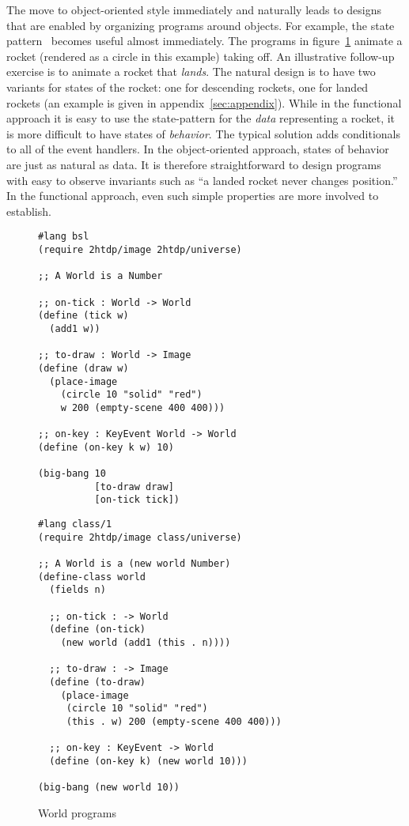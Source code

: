 \documentclass[submission,copyright]{eptcs}
\begin{document}
The move to object-oriented style immediately and naturally leads to
designs that are enabled by organizing programs around objects.  For
example, the state pattern~\cite{samth:GOF} becomes useful almost
immediately.  The programs in figure~\ref{fig:world} animate a rocket
(rendered as a circle in this example) taking off.  An illustrative
follow-up exercise is to animate a rocket that \emph{lands}.  The
natural design is to have two variants for states of the rocket: one
for descending rockets, one for landed rockets (an example is given in
appendix~\ref{sec:appendix}).  While in the functional approach it
is easy to use the state-pattern for the \emph{data} representing a
rocket, it is more difficult to have states of \emph{behavior}.  The
typical solution adds conditionals to all of the event handlers.  In
the object-oriented approach, states of behavior are just as natural
as data.  It is therefore straightforward to design programs with easy
to observe invariants such as ``a landed rocket never changes
position.''  In the functional approach, even such simple properties
are more involved to establish.

\begin{figure}
\begin{minipage}[t]{3.4in}
\begin{verbatim}
#lang bsl
(require 2htdp/image 2htdp/universe)

;; A World is a Number

;; on-tick : World -> World
(define (tick w)
  (add1 w))

;; to-draw : World -> Image
(define (draw w)
  (place-image 
    (circle 10 "solid" "red")
    w 200 (empty-scene 400 400)))

;; on-key : KeyEvent World -> World
(define (on-key k w) 10)

(big-bang 10
          [to-draw draw]
          [on-tick tick])
\end{verbatim}
\end{minipage}
\begin{minipage}[t]{3in}
\begin{verbatim}
#lang class/1
(require 2htdp/image class/universe)

;; A World is a (new world Number)
(define-class world
  (fields n)

  ;; on-tick : -> World
  (define (on-tick)
    (new world (add1 (this . n))))

  ;; to-draw : -> Image
  (define (to-draw) 
    (place-image 
     (circle 10 "solid" "red")
     (this . w) 200 (empty-scene 400 400)))

  ;; on-key : KeyEvent -> World
  (define (on-key k) (new world 10)))
  
(big-bang (new world 10))
\end{verbatim}
\end{minipage}
\caption{World programs}
\label{fig:world}
\end{figure}
\end{document}
